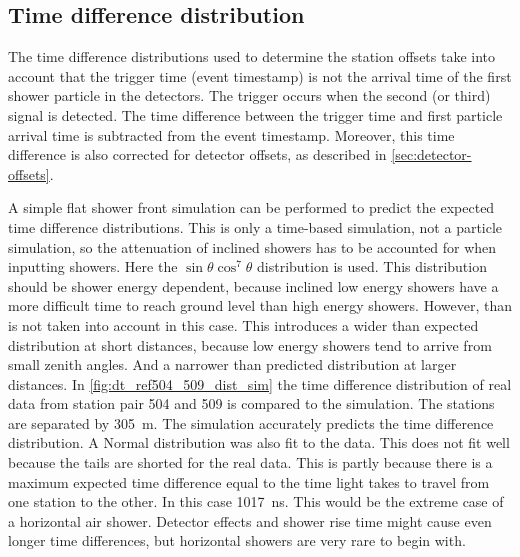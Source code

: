 \subsection{Time difference distribution}
\label{ssec:time-difference-distribution}

The time difference distributions used to determine the station offsets take into account that the trigger time (event timestamp) is not the arrival time of the first shower particle in the detectors. The trigger occurs when the second (or third) signal is detected. The time difference between the trigger time and first particle arrival time is subtracted from the event timestamp. Moreover, this time difference is also corrected for detector offsets, as described in \cref{sec:detector-offsets}.

A simple flat shower front simulation can be performed to predict the expected time difference distributions. This is only a time-based simulation, not a particle simulation, so the attenuation of inclined showers has to be accounted for when inputting showers. Here the $\sin \theta \cos^7 \theta$ distribution is used. This distribution should be shower energy dependent, because inclined low energy showers have a more difficult time to reach ground level than high energy showers. However, than is not taken into account in this case. This introduces a wider than expected distribution at short distances, because low energy showers tend to arrive from small zenith angles. And a narrower than predicted distribution at larger distances. In \cref{fig:dt_ref504_509_dist_sim} the time difference distribution of real data from station pair 504 and 509 is compared to the simulation. The stations are separated by \SI{305}{\meter}. The simulation accurately predicts the time difference distribution. A Normal distribution was also fit to the data. This does not fit well because the tails are shorted for the real data. This is partly because there is a maximum expected time difference equal to the time light takes to travel from one station to the other. In this case \SI{1017}{\ns}. This would be the extreme case of a horizontal air shower. Detector effects and shower rise time might cause even longer time differences, but horizontal showers are very rare to begin with.

